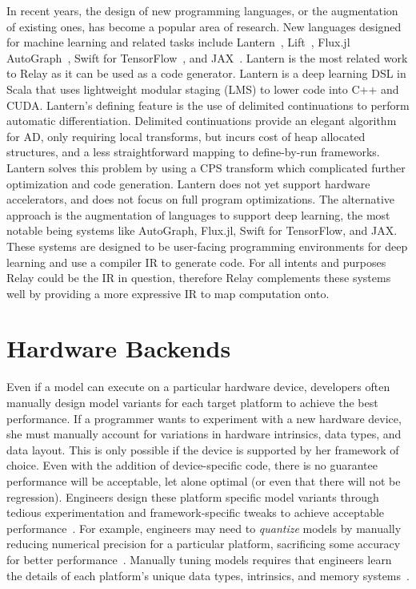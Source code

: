 In recent years, the design of new programming languages,
    or the augmentation of existing ones, has become
    a popular area of research.
New languages designed for machine learning and related
    tasks include Lantern~\citep{lantern}, Lift~\citep{lift_lang}, Flux.jl~\citep{fluxjl}
    AutoGraph~\citep{moldovan2018autograph}, Swift for TensorFlow~\citep{tf_swift},
    and JAX~\citep{jax}.
Lantern \citep{lantern} is the most related work to Relay as it can
    be used as a code generator.
Lantern is a deep learning DSL in Scala
    that uses lightweight modular staging (LMS) to lower code into C++ and CUDA.
Lantern's defining feature is the use of delimited continuations to perform
    automatic differentiation.
Delimited continuations provide an elegant algorithm for AD,
    only requiring local transforms, but incurs cost of
    heap allocated structures, and a less straightforward
    mapping to define-by-run frameworks.
Lantern solves this problem by using a CPS transform which
    complicated further optimization and code generation.
Lantern does not yet support hardware accelerators, and
    does not focus on full program optimizations.
The alternative approach is the augmentation of languages to support deep learning,
  the most notable being systems like AutoGraph, Flux.jl, Swift for TensorFlow,
  and JAX.
These systems are designed to be user-facing programming
    environments for deep learning and use a compiler IR
    to generate code.
For all intents and purposes Relay could be the IR in
    question, therefore  Relay complements these systems well by
    providing a more expressive IR to map computation onto.

\section{Hardware Backends}

Even if a model can execute on
  a particular hardware device, developers
  often manually design model
  variants for each target platform
  to achieve the best performance.
If a programmer wants to experiment with a new hardware device,
  she must manually account for variations in hardware intrinsics, data
  types, and data layout.
This is only possible if the device is supported by her framework of choice.
Even with the addition of device-specific code,
  there is no guarantee performance will be acceptable, let alone optimal
  (or even that there will not be regression).
Engineers design these platform specific model variants
  through tedious experimentation and framework-specific tweaks
  to achieve acceptable performance~\citep{mobilenet}. %
For example,
  engineers may need to \textit{quantize} models
  by manually reducing numerical precision for a particular platform,
  sacrificing some accuracy for better performance~\citep{xnornet}.
Manually tuning models requires
  that engineers learn the details of
  each platform's
  unique data types, intrinsics, and memory systems~\citep{fb_fp_hw, tpuv1, brainwave, nn_on_si}.

